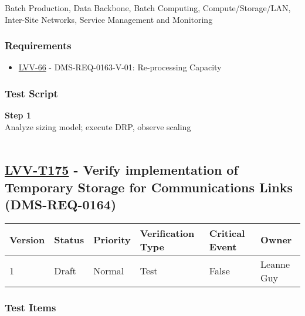 Batch Production, Data Backbone, Batch Computing, Compute/Storage/LAN,
Inter-Site Networks, Service Management and Monitoring

\hypertarget{requirements-151}{%
\subsubsection{Requirements}\label{requirements-151}}

\begin{itemize}
\tightlist
\item
  \href{https://jira.lsstcorp.org/browse/LVV-66}{LVV-66} -
  DMS-REQ-0163-V-01: Re-processing Capacity
\end{itemize}

\hypertarget{test-script-151}{%
\subsubsection{Test Script}\label{test-script-151}}

\textbf{Step 1}\\
\hspace*{0.333em}Analyze sizing model; execute DRP, observe scaling\\
~\\

\hypertarget{lvv-t175---verify-implementation-of-temporary-storage-for-communications-links-dms-req-0164}{%
\subsection{\texorpdfstring{\href{https://jira.lsstcorp.org/secure/Tests.jspa\#/testCase/LVV-T175}{LVV-T175}
- Verify implementation of Temporary Storage for Communications Links
(DMS-REQ-0164)}{LVV-T175 - Verify implementation of Temporary Storage for Communications Links (DMS-REQ-0164)}}\label{lvv-t175---verify-implementation-of-temporary-storage-for-communications-links-dms-req-0164}}

\begin{longtable}[]{@{}llllll@{}}
\toprule
Version & Status & Priority & Verification Type & Critical Event &
Owner\tabularnewline
\midrule
\endhead
1 & Draft & Normal & Test & False & Leanne Guy\tabularnewline
\bottomrule
\end{longtable}

\hypertarget{test-items-151}{%
\subsubsection{Test Items}\label{test-items-151}}

